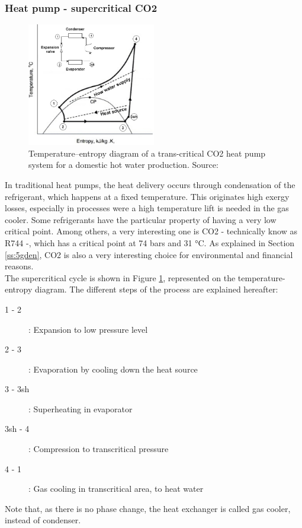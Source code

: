 \documentclass{article}
\begin{document}
\subsubsection{Heat pump - supercritical CO2}\label{sss:hp_CO2}

\begin{figure}[htp]
	\centering
	\includegraphics[width=0.5\textwidth]{HP_cylce_CO2.png}
	\caption{Temperature–entropy diagram of a trans-critical CO2 heat pump system for a domestic hot water production. Source: \cite{kimPerformanceTranscriticalCO22005}}
	\label{fig:hp_CO2}
\end{figure}

In traditional heat pumps, the heat delivery occurs through condensation of the refrigerant, which happens at a fixed temperature. This originates high exergy losses, especially in processes were a high temperature lift is needed in the gas cooler. Some refrigerants have the particular property of having a very low critical point. Among others, a very interesting one is CO2 - technically know as R744 -, which has a critical point at 74 bars and 31 \si{\celsius}\cite{cavalliniPROPERTIESCO2REFRIGERANT}. As explained in Section \ref{ss:5gden}, CO2 is also a very interesting choice for environmental and financial reasons.\\

The supercritical cycle is shown in Figure \ref{fig:hp_CO2}, represented on the temperature-entropy diagram. The different steps of the process are explained hereafter: 
\begin{description}
\item [1 - 2]: Expansion to low pressure level
\item [2 - 3]: Evaporation by cooling down the heat source
\item [3 - 3sh]: Superheating in evaporator
\item [3sh - 4]: Compression to transcritical pressure
\item [4 - 1]: Gas cooling in transcritical area, to heat water
\end{description}
Note that, as there is no phase change, the heat exchanger is called gas cooler, instead of condenser.\\
\end{document}
